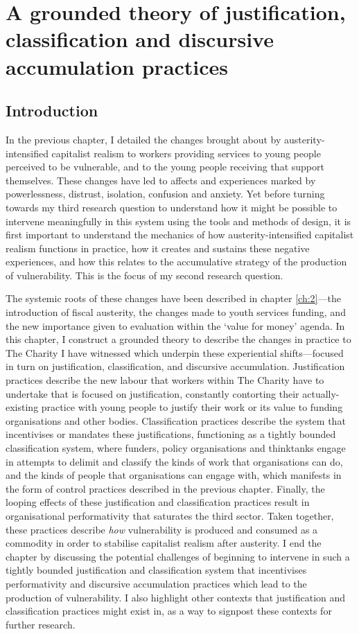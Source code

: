\chapter{A grounded theory of justification, classification and discursive accumulation practices}
\label{ch:6}

\section{Introduction}
\label{sec:6-1-intro}
In the previous chapter, I detailed the changes brought about by austerity-intensified capitalist realism to workers providing services to young people perceived to be vulnerable, and to the young people receiving that support themselves. These changes have led to affects and experiences marked by powerlessness, distrust, isolation, confusion and anxiety. Yet before turning towards my third research question to understand how it might be possible to intervene meaningfully in this system using the tools and methods of design, it is first important to understand the mechanics of how austerity-intensified capitalist realism functions in practice, how it creates and sustains these negative experiences, and how this relates to the accumulative strategy of the production of vulnerability. This is the focus of my second research question.

The systemic roots of these changes have been described in chapter \ref{ch:2}—the introduction of fiscal austerity, the changes made to youth services funding, and the new importance given to evaluation within the ‘value for money’ agenda. In this chapter, I construct a grounded theory to describe the changes in practice to The Charity I have witnessed which underpin these experiential shifts—focused in turn on justification, classification, and discursive accumulation. Justification practices describe the new labour that workers within The Charity have to undertake that is focused on justification, constantly contorting their actually-existing practice with young people to justify their work or its value to funding organisations and other bodies. Classification practices describe the system that incentivises or mandates these justifications, functioning as a tightly bounded classification system, where funders, policy organisations and thinktanks engage in attempts to delimit and classify the kinds of work that organisations can do, and the kinds of people that organisations can engage with, which manifests in the form of control practices described in the previous chapter. Finally, the looping effects of these justification and classification practices result in organisational performativity that saturates the third sector. Taken together, these practices describe \emph{how} vulnerability is produced and consumed as a commodity in order to stabilise capitalist realism after austerity.  I end the chapter by discussing the potential challenges of beginning to intervene in such a tightly bounded justification and classification system that incentivises performativity and discursive accumulation practices which lead to the production of vulnerability. I also highlight other contexts that justification and classification practices might exist in, as a way to signpost these contexts for further research. 

